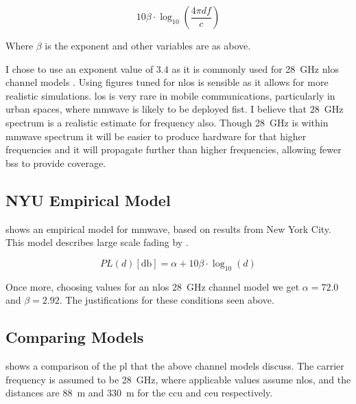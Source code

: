\begin{equation}
	10 \beta \cdot \log_{10} \left( \frac{4 \pi d f}{c} \right)
	\label{eq:ple}
\end{equation}

\par
Where $\beta$ is the exponent and other variables are as above.

\par
I chose to use an exponent value of $3.4$ as it is commonly used for \SI{28}{\giga\hertz} \ac{nlos} channel models \cite{sun:2016,samimi:2016,lee:2018}.
Using figures tuned for \ac{nlos} is sensible as it allows for more realistic simulations.
\ac{los} is very rare in mobile communications, particularly in urban spaces, where \ac{mmwave} is likely to be deployed fist.
I believe that \SI{28}{\giga\hertz} spectrum is a realistic estimate for frequency also.
Though \SI{28}{\giga\hertz} is within \ac{mmwave} spectrum it will be easier to produce hardware for that higher frequencies and it will propagate further than higher frequencies, allowing fewer \acp{bs} to provide coverage.

\subsection{NYU Empirical Model}
\cite{akdeniz:2014} shows an empirical model for \ac{mmwave}, based on results from New York City.
This model describes large scale fading by .

\begin{equation}
	PL(d) [\si{\decibel}]= \alpha + 10\beta \cdot \log_{10}(d)
	\label{eq:nyu}
\end{equation}

\par
Once more, choosing values for an \ac{nlos} \SI{28}{\giga\hertz} channel model we get $\alpha = 72.0$ and $\beta = 2.92$.
The justifications for these conditions seen above.

\subsection{Comparing Models}

 shows a comparison of the \ac{pl} that the above channel models discuss.
The carrier frequency is assumed to be \SI{28}{\giga\hertz}, where applicable values assume \ac{nlos}, and the distances are \SI{88}{\metre} and \SI{330}{\metre} for the \ac{ccu} and \ac{ceu} respectively.

